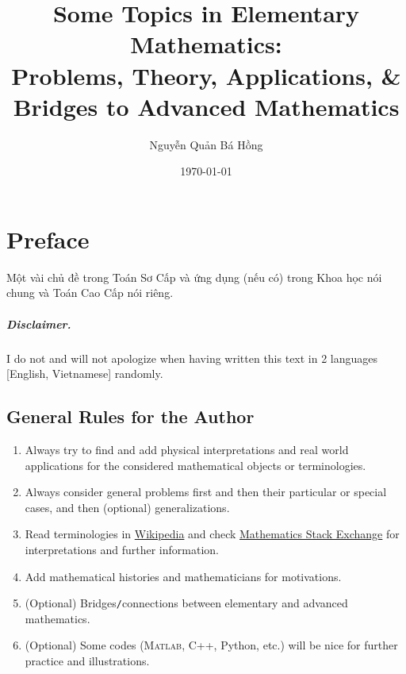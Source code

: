 \documentclass[oneside]{book}
\title{Some Topics in Elementary Mathematics:\\Problems, Theory, Applications, \& Bridges to Advanced Mathematics}
\author{Nguyễn Quản Bá Hồng}
\date{\today}
\numberwithin{equation}{section}
\begin{document}
\maketitle
\setcounter{secnumdepth}{3}
\setcounter{tocdepth}{3}
\tableofcontents


\chapter*{Preface}
Một vài chủ đề trong Toán Sơ Cấp và ứng dụng (nếu có) trong Khoa học nói chung và Toán Cao Cấp nói riêng.


\paragraph*{Disclaimer.} I do not and will not apologize when having written this text in 2 languages [English, Vietnamese] randomly.

\section*{General Rules for the Author}
\begin{enumerate}
	\item Always try to find and add physical interpretations and real world applications for the considered mathematical objects or terminologies.
	\item Always consider general problems first and then their particular or special cases, and then (optional) generalizations.
	\item Read terminologies in \href{https://www.wikipedia.org/}{Wikipedia} and check \href{https://math.stackexchange.com/}{Mathematics Stack Exchange} for interpretations and further information.
	\item Add mathematical histories and mathematicians for motivations.
	\item (Optional) Bridges\texttt{/}connections between elementary and advanced mathematics.
	\item (Optional) Some codes (\textsc{Matlab}, C++, Python, etc.) will be nice for further practice and illustrations.
\end{enumerate}
\end{document}
